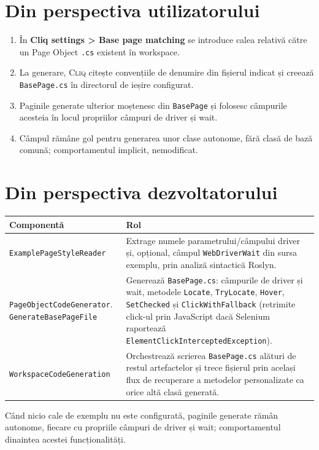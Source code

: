 \documentclass[12pt,a4paper]{report}
\newcommand{\UI}[1]{\textbf{#1}}
\newcommand{\File}[1]{\nolinkurl{#1}}
\newcommand{\Cliq}{\textsc{Cliq}}
\begin{document}
\section{Din perspectiva utilizatorului}

\begin{enumerate}
  \item În \UI{Cliq settings > Base page matching} se introduce calea relativă către un Page Object \File{.cs} existent în workspace.
  \item La generare, \Cliq{} citește convențiile de denumire din fișierul indicat și creează \File{BasePage.cs} în directorul de ieșire configurat.
  \item Paginile generate ulterior moștenesc din \File{BasePage} și folosesc câmpurile acesteia în locul propriilor câmpuri de driver și wait.
  \item Câmpul rămâne gol pentru generarea unor clase autonome, fără clasă de bază comună; comportamentul implicit, nemodificat.
\end{enumerate}

\section{Din perspectiva dezvoltatorului}

\begin{tabularx}{\textwidth}{@{}p{5.2cm}Y@{}}
\toprule \textbf{Componentă} & \textbf{Rol} \\
\midrule
\File{ExamplePageStyleReader} & Extrage numele parametrului/câmpului driver și, opțional, câmpul \File{WebDriverWait} din sursa exemplu, prin analiză sintactică Roslyn. \\
\File{PageObjectCodeGenerator}. \File{GenerateBasePageFile} & Generează \File{BasePage.cs}: câmpurile de driver și wait, metodele \File{Locate}, \File{TryLocate}, \File{Hover}, \File{SetChecked} și \File{ClickWithFallback} (retrimite click-ul prin JavaScript dacă Selenium raportează \File{ElementClickInterceptedException}). \\
\File{WorkspaceCodeGeneration} & Orchestrează scrierea \File{BasePage.cs} alături de restul artefactelor și trece fișierul prin același flux de recuperare a metodelor personalizate ca orice altă clasă generată. \\
\bottomrule
\end{tabularx}

Când nicio cale de exemplu nu este configurată, paginile generate rămân autonome, fiecare cu propriile câmpuri de driver și wait; comportamentul dinaintea acestei funcționalități.
\end{document}
